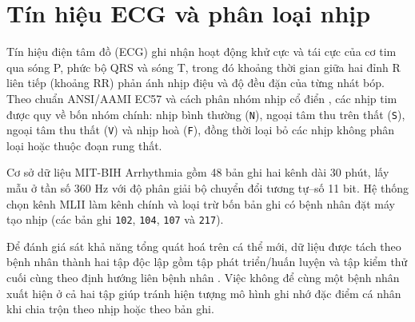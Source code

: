 \section{Tín hiệu ECG và phân loại nhịp}\label{sec:ecg}

Tín hiệu điện tâm đồ (ECG) ghi nhận hoạt động khử cực và tái cực của cơ tim qua sóng P, phức bộ QRS và sóng T, trong đó khoảng thời gian giữa hai đỉnh R liên tiếp (khoảng RR) phản ánh nhịp điệu và độ đều đặn của từng nhát bóp. Theo chuẩn ANSI/AAMI EC57 \cite{aami2012ec57} và cách phân nhóm nhịp cổ điển \cite{dechazal2004automatic}, các nhịp tim được quy về bốn nhóm chính: nhịp bình thường (\texttt{N}), ngoại tâm thu trên thất (\texttt{S}), ngoại tâm thu thất (\texttt{V}) và nhịp hoà (\texttt{F}), đồng thời loại bỏ các nhịp không phân loại hoặc thuộc đoạn rung thất.

Cơ sở dữ liệu MIT-BIH Arrhythmia \cite{moody2001impact} gồm 48 bản ghi hai kênh dài 30 phút, lấy mẫu ở tần số $360\text{ Hz}$ với độ phân giải bộ chuyển đổi tương tự--số 11 bit. Hệ thống chọn kênh MLII làm kênh chính và loại trừ bốn bản ghi có bệnh nhân đặt máy tạo nhịp (các bản ghi \texttt{102}, \texttt{104}, \texttt{107} và \texttt{217}).

Để đánh giá sát khả năng tổng quát hoá trên cá thể mới, dữ liệu được tách theo bệnh nhân thành hai tập độc lập gồm tập phát triển/huấn luyện và tập kiểm thử cuối cùng theo định hướng liên bệnh nhân \cite{dechazal2004automatic, li2026lightweight}. Việc không để cùng một bệnh nhân xuất hiện ở cả hai tập giúp tránh hiện tượng mô hình ghi nhớ đặc điểm cá nhân khi chia trộn theo nhịp hoặc theo bản ghi.
